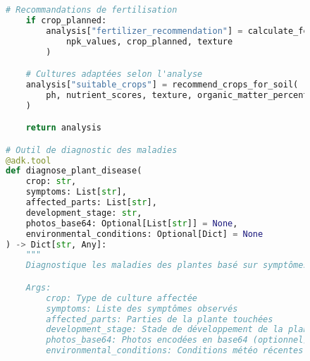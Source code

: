 \begin{figure}[H]
\begin{lstlisting}[language=Python, caption=Implémentation d'outils spécialisés pour l'agriculture]
    # Recommandations de fertilisation
    if crop_planned:
        analysis["fertilizer_recommendation"] = calculate_fertilizer_needs(
            npk_values, crop_planned, texture
        )

    # Cultures adaptées selon l'analyse
    analysis["suitable_crops"] = recommend_crops_for_soil(
        ph, nutrient_scores, texture, organic_matter_percent
    )

    return analysis

# Outil de diagnostic des maladies
@adk.tool
def diagnose_plant_disease(
    crop: str,
    symptoms: List[str],
    affected_parts: List[str],
    development_stage: str,
    photos_base64: Optional[List[str]] = None,
    environmental_conditions: Optional[Dict] = None
) -> Dict[str, Any]:
    """
    Diagnostique les maladies des plantes basé sur symptômes.

    Args:
        crop: Type de culture affectée
        symptoms: Liste des symptômes observés
        affected_parts: Parties de la plante touchées
        development_stage: Stade de développement de la plante
        photos_base64: Photos encodées en base64 (optionnel)
        environmental_conditions: Conditions météo récentes


\end{lstlisting}
\end{figure}
